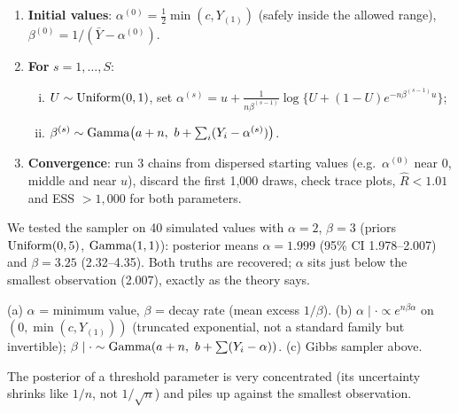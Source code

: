 \documentclass[11pt]{article}
\begin{document}
\begin{enumerate}[1.]
\item \textbf{Initial values}: $\alpha^{(0)}=\frac12\min(c,Y_{(1)})$ (safely inside the allowed range), $\beta^{(0)}=1/(\bar Y-\alpha^{(0)})$.
\item \textbf{For} $s=1,\dots,S$:
\begin{enumerate}[(i)]
\item $U\sim\mathrm{Uniform}(0,1)$, set $\alpha^{(s)}=u+\frac{1}{n\beta^{(s-1)}}\log\{U+(1-U)e^{-n\beta^{(s-1)}u}\}$;
\item $\beta^{(s)}\sim\dist{Gamma}\big(a+n,\ b+\sum_i(Y_i-\alpha^{(s)})\big)$.
\end{enumerate}
\item \textbf{Convergence}: run 3 chains from dispersed starting values (e.g.\ $\alpha^{(0)}$ near 0, middle and near $u$), discard the first 1{,}000 draws, check trace plots, $\hat R<1.01$ and ESS $>1{,}000$ for both parameters.
\end{enumerate}

\begin{sanity}
We tested the sampler on 40 simulated values with $\alpha=2$, $\beta=3$ (priors $\mathrm{Uniform}(0,5)$, $\mathrm{Gamma}(1,1)$): posterior means $\alpha=1.999$ (95\% CI 1.978--2.007) and $\beta=3.25$ (2.32--4.35). Both truths are recovered; $\alpha$ sits just below the smallest observation (2.007), exactly as the theory says.
\end{sanity}

\begin{answer}
(a) $\alpha$ = minimum value, $\beta$ = decay rate (mean excess $1/\beta$). (b) $\alpha\mid\cdot\propto e^{n\beta\alpha}$ on $(0,\min(c,Y_{(1)}))$ (truncated exponential, not a standard family but invertible); $\beta\mid\cdot\sim\dist{Gamma}(a+n,\ b+\sum(Y_i-\alpha))$. (c) Gibbs sampler above.
\end{answer}

\begin{takeaway}
The posterior of a threshold parameter is very concentrated (its uncertainty shrinks like $1/n$, not $1/\sqrt n$) and piles up against the smallest observation.
\end{takeaway}

\end{document}
